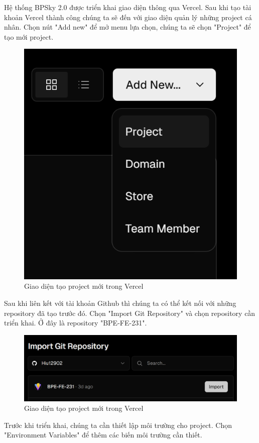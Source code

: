 Hệ thống BPSky 2.0 được triển khai giao diện thông qua Vercel. Sau khi tạo tài khoản Vercel thành công chúng ta sẽ đến với giao diện quản lý những project cá nhân. Chọn nút "Add new" để mở menu lựa chọn, chúng ta sẽ chọn "Project" để tạo mới project.

\begin{figure}[H]
    \centering
    \includegraphics[width=0.5\linewidth]{Content/Hiện thực hệ thống/images/createProjectVercel.png}
    \vspace{0.5cm}
    \caption{Giao diện tạo project mới trong Vercel}
    \label{fig:Tạo project mới trong Vercel}
\end{figure}

Sau khi liên kết với tài khoản Github thì chúng ta có thể kết nối với những repository đã tạo trước đó. Chọn "Import Git Repository" và chọn repository cần triển khai. Ở đây là repository "BPE-FE-231".

\begin{figure}[H]
    \centering
    \includegraphics[width=0.5\linewidth]{Content/Hiện thực hệ thống/images/importRepoVercel.png}
    \vspace{0.5cm}
    \caption{Giao diện tạo project mới trong Vercel}
    \label{fig:Tạo project mới trong Vercel}
\end{figure}

Trước khi triển khai, chúng ta cần thiết lập môi trường cho project. Chọn "Environment Variables" để thêm các biến môi trường cần thiết.

